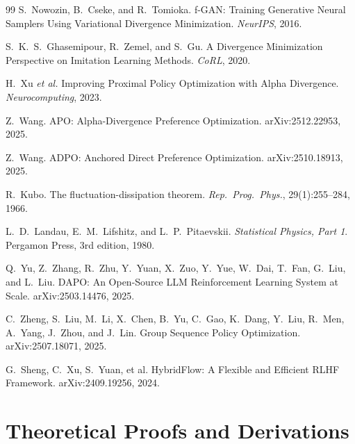 \documentclass[11pt]{article}
\theoremstyle{definition}
\theoremstyle{remark}
\begin{document}
\begin{thebibliography}{99}
S.~Nowozin, B.~Cseke, and R.~Tomioka.
f-GAN: Training Generative Neural Samplers Using Variational Divergence Minimization.
\emph{NeurIPS}, 2016.

S.~K.~S.~Ghasemipour, R.~Zemel, and S.~Gu.
A Divergence Minimization Perspective on Imitation Learning Methods.
\emph{CoRL}, 2020.

H.~Xu \emph{et al.}
Improving Proximal Policy Optimization with Alpha Divergence.
\emph{Neurocomputing}, 2023.

Z.~Wang.
APO: Alpha-Divergence Preference Optimization.
arXiv:2512.22953, 2025.

Z.~Wang.
ADPO: Anchored Direct Preference Optimization.
arXiv:2510.18913, 2025.

R.~Kubo.
The fluctuation-dissipation theorem.
\emph{Rep.\ Prog.\ Phys.}, 29(1):255--284, 1966.

L.~D.~Landau, E.~M.~Lifshitz, and L.~P.~Pitaevskii.
\emph{Statistical Physics, Part 1}.
Pergamon Press, 3rd edition, 1980.

Q.~Yu, Z.~Zhang, R.~Zhu, Y.~Yuan, X.~Zuo, Y.~Yue, W.~Dai, T.~Fan, G.~Liu, and L.~Liu.
DAPO: An Open-Source LLM Reinforcement Learning System at Scale.
arXiv:2503.14476, 2025.

C.~Zheng, S.~Liu, M.~Li, X.~Chen, B.~Yu, C.~Gao, K.~Dang, Y.~Liu, R.~Men, A.~Yang, J.~Zhou, and J.~Lin.
Group Sequence Policy Optimization.
arXiv:2507.18071, 2025.

G.~Sheng, C.~Xu, S.~Yuan, et al.
HybridFlow: A Flexible and Efficient RLHF Framework.
arXiv:2409.19256, 2024.

\end{thebibliography}

\appendix
\section{Theoretical Proofs and Derivations}
\label{app:proofs}
\end{document}
